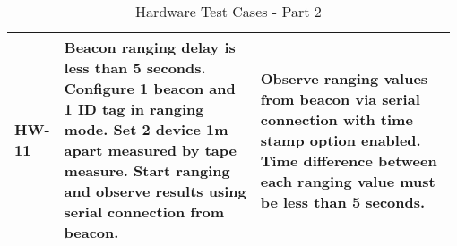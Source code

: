 \begin{table}[h!]
\begin{tabular}{|p{0.075\linewidth}|p{0.45\linewidth}|p{0.45\linewidth}|}
	\hline 
	HW-11
	& Beacon ranging delay is less than 5 seconds. Configure 1 beacon and 1 ID tag in ranging mode. Set 2 device 1m apart measured by tape measure. Start ranging and observe results using serial connection from beacon.
	& Observe ranging values from beacon via serial connection with time stamp option enabled. Time difference between each ranging value must be less than 5 seconds. \\
	
    \hline
    \end{tabular}
    \caption{Hardware Test Cases - Part 2}
\end{table}
